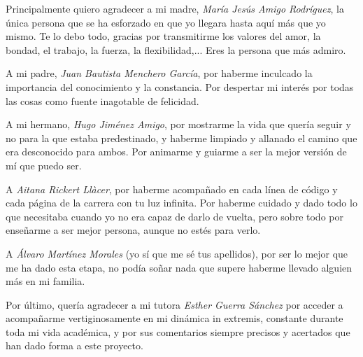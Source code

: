
Principalmente quiero agradecer a mi madre, \textit{María Jesús Amigo Rodríguez}, la única persona que se ha esforzado en que yo llegara hasta aquí más que yo mismo. Te lo debo todo, gracias por transmitirme los valores del amor, la bondad, el trabajo, la fuerza, la flexibilidad,... Eres la persona que más admiro.

A mi padre, \textit{Juan Bautista Menchero García}, por haberme inculcado la importancia del conocimiento y la constancia. Por despertar mi interés por todas las cosas como fuente inagotable de felicidad.

A mi hermano, \textit{Hugo Jiménez Amigo}, por mostrarme la vida que quería seguir y no para la que estaba predestinado, y haberme limpiado y allanado el camino que era desconocido para ambos. Por animarme y guiarme a ser la mejor versión de mí que puedo ser.

A \textit{Aitana Rickert Llàcer}, por haberme acompañado en cada línea de código y cada página de la carrera con tu luz infinita. Por haberme cuidado y dado todo lo que necesitaba cuando yo no era capaz de darlo de vuelta, pero sobre todo por enseñarme a ser mejor persona, aunque no estés para verlo.

A \textit{Álvaro Martínez Morales} (yo sí que me sé tus apellidos), por ser lo mejor que me ha dado esta etapa, no podía soñar nada que supere haberme llevado alguien más en mi familia.

Por último, quería agradecer a mi tutora \textit{Esther Guerra Sánchez} por acceder a acompañarme vertiginosamente en mi dinámica in extremis, constante durante toda mi vida académica, y por sus comentarios siempre precisos y acertados que han dado forma a este proyecto.

